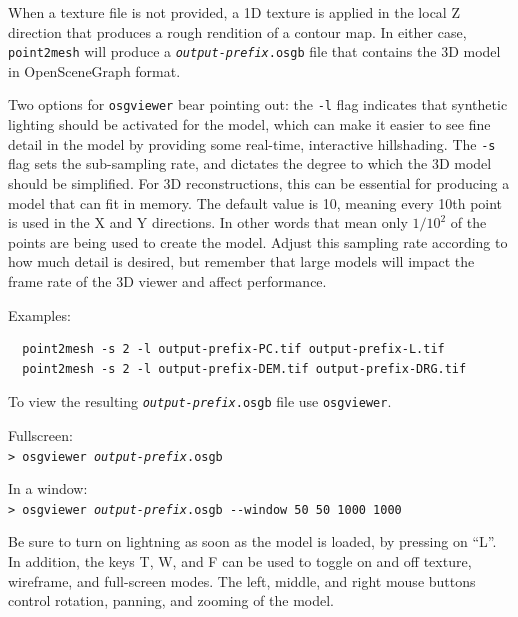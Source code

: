 When a texture file is not provided, a 1D texture is applied in the local Z direction
that produces a rough rendition of a contour map.  In either case,
\texttt{point2mesh} will produce a \texttt{\textit{output-prefix}.osgb}
file that contains the 3D model in OpenSceneGraph format.

Two options for \texttt{osgviewer} bear pointing out: the \texttt{-l}
flag indicates that synthetic lighting should be activated for the
model, which can make it easier to see fine detail in the model by
providing some real-time, interactive hillshading.  The \verb#-s#
flag sets the sub-sampling rate, and dictates the degree to which
the 3D model should be simplified.  For 3D reconstructions, this
can be essential for producing a model that can fit in memory.  The
default value is 10, meaning every 10th point is used in the X and
Y directions. In other words that mean only $1/10^2$ of the points
are being used to create the model. Adjust this sampling rate
according to how much detail is desired, but remember that large
models will impact the frame rate of the 3D viewer and affect
performance.

Examples:
\begin{verbatim}
  point2mesh -s 2 -l output-prefix-PC.tif output-prefix-L.tif
  point2mesh -s 2 -l output-prefix-DEM.tif output-prefix-DRG.tif
\end{verbatim}

To view the resulting \texttt{\textit{output-prefix}.osgb} file use
\texttt{osgviewer}.

\hspace*{2em}Fullscreen:\\
\hspace*{2em}\texttt{> osgviewer \textit{output-prefix}.osgb}

\hspace*{2em}In a window:\\
\hspace*{2em}\texttt{> osgviewer \textit{output-prefix}.osgb -\/-window 50 50 1000 1000}

Be sure to turn on lightning as soon as the model is loaded, by pressing on ``L''.
In addition, the keys T, W, and F can be used to toggle on
and off texture, wireframe, and full-screen modes.  The left, middle, and
right mouse buttons control rotation, panning, and zooming of the
model.

